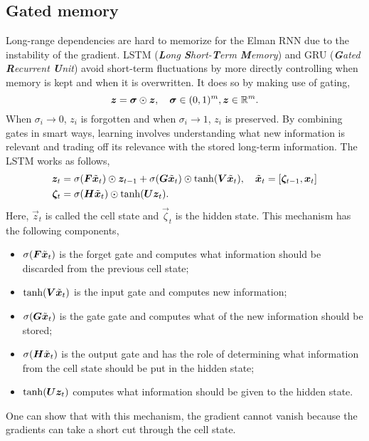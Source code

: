 \subsection{Gated memory}

Long-range dependencies are hard to memorize for the Elman RNN due to the instability of the
gradient. LSTM (\textit{\textbf{L}ong \textbf{S}hort-\textbf{T}erm \textbf{M}emory})
\citep{schmidhuber1997long} and GRU (\textit{\textbf{G}ated \textbf{R}ecurrent \textbf{U}nit})
\citep{cho2014learning} avoid short-term fluctuations by more directly controlling when memory is
kept and when it is overwritten. It does so by making use of gating, \[
    \bm{z} = \bm{\sigma} \odot \bm{z}, \quad \bm{\sigma} \in (0,1)^m, \bm{z} \in \mathbb{R}^m.
\]
When $\sigma_i \to 0$, $z_i$ is forgotten and when $\sigma_i \to 1$, $z_i$ is preserved. By
combining gates in smart ways, learning involves understanding what new information is relevant and
trading off its relevance with the stored long-term information. The LSTM works as follows,
\begin{align*}
    \vec{z}_t     & = \sigma \lft( \mat{F} \tilde{\vec{x}}_t \rgt) \odot \vec{z}_{t-1} + \sigma \lft( \mat{G} \tilde{\vec{x}}_t \rgt) \odot \tanh \lft( \mat{V}\tilde{\vec{x}}_t \rgt), \quad \tilde{\vec{x}}_t = \lft[ \vec{\zeta}_{t-1}, \vec{x}_t \rgt] \\
    \vec{\zeta}_t & = \sigma \lft( \mat{H} \tilde{\vec{x}}_t \rgt) \odot \tanh \lft( \mat{U} \vec{z}_t \rgt).
\end{align*}
Here, $\vec{z}_t$ is called the cell state and $\vec{\zeta}_t$ is the hidden state. This mechanism has the following components,
\begin{itemize}
    \item $\sigma(\bm{F}\tilde{\bm{x}}_t)$ is the forget gate and computes what information should be discarded from the previous cell state;
    \item $\tanh(\bm{V}\tilde{\bm{x}}_t)$ is the input gate and computes new information;
    \item $\sigma(\bm{G}\tilde{\bm{x}}_t)$ is the gate gate and computes what of the new information should be stored;
    \item $\sigma(\bm{H} \tilde{\bm{x}}_t)$ is the output gate and has the role of determining what information from the cell state should be put in the hidden state;
    \item $\tanh(\bm{U} \bm{z}_t)$ computes what information should be given to the hidden state.
\end{itemize}
One can show that with this mechanism, the gradient cannot vanish because the gradients can take a
short cut through the cell state.

